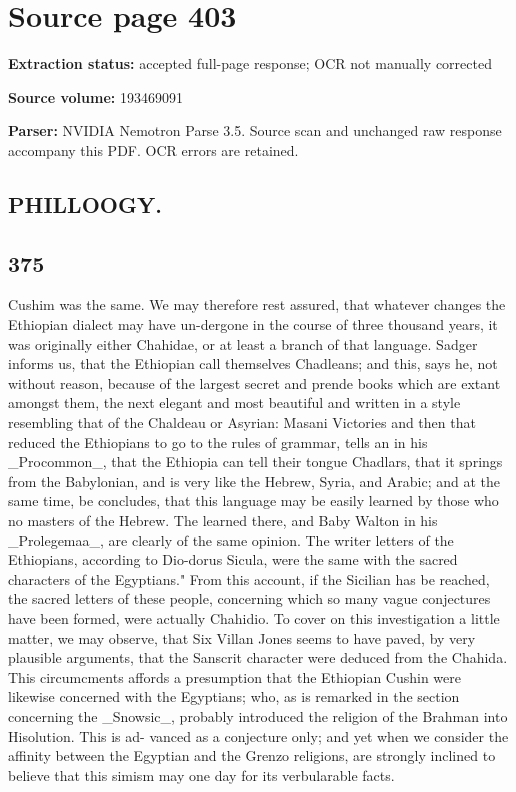 \clearpage
\section{Source page 403}
\textbf{Extraction status:} accepted full-page response; OCR not manually corrected\par
\textbf{Source volume:} 193469091\par
\textbf{Parser:} NVIDIA Nemotron Parse 3.5. Source scan and unchanged raw response accompany this PDF. OCR errors are retained.\par\medskip
\subsection*{PHILLOOGY.}
\subsection*{375}
Cushim was the same. We may therefore rest assured, that whatever changes the Ethiopian dialect may have un-dergone in the course of three thousand years, it was originally either Chahidae, or at least a branch of that language. Sadger informs us, that the Ethiopian call themselves Chadleans; and this, says he, not without reason, because of the largest secret and prende books which are extant amongst them, the next elegant and most beautiful and written in a style resembling that of the Chaldeau or Asyrian: Masani Victories and then that reduced the Ethiopians to go to the rules of grammar, tells an in his \_Procommon\_, that the Ethiopia can tell their tongue Chadlars, that it springs from the Babylonian, and is very like the Hebrew, Syria, and Arabic; and at the same time, be concludes, that this language may be easily learned by those who no masters of the Hebrew. The learned there, and Baby Walton in his \_Prolegemaa\_, are clearly of the same opinion. The writer letters of the Ethiopians, according to Dio-dorus Sicula, were the same with the sacred characters of the Egyptians." From this account, if the Sicilian has be reached, the sacred letters of these people, concerning which so many vague conjectures have been formed, were actually Chahidio. To cover on this investigation a little matter, we may observe, that Six Villan Jones seems to have paved, by very plausible arguments, that the Sanscrit character were deduced from the Chahida. This circumcments affords a presumption that the Ethiopian Cushin were likewise concerned with the Egyptians; who, as is remarked in the section concerning the \_Snowsic\_, probably introduced the religion of the Brahman into Hisolution. This is ad- vanced as a conjecture only; and yet when we consider the affinity between the Egyptian and the Grenzo religions, are strongly inclined to believe that this simism may one day for its verbularable facts.\par\medskip
